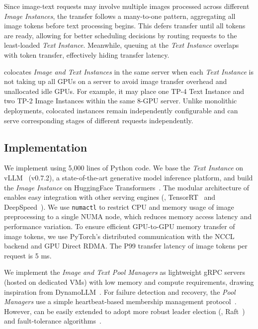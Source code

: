 Since image-text requests may involve multiple images processed across different \emph{Image Instances}, the transfer follows a many-to-one pattern, aggregating all image tokens before text processing begins.
This defers transfer until all tokens are ready, allowing for better scheduling decisions by routing requests to the least-loaded \emph{Text Instance}.
Meanwhile, queuing at the \emph{Text Instance} overlaps with token transfer, effectively hiding transfer latency.

\sysname{} colocates \emph{Image and Text Instances} in the same server when each \emph{Text Instance} is not taking up all GPUs on a server to avoid image transfer overhead and unallocated idle GPUs.
For example, it may place one TP-4 Text Instance and two TP-2 Image Instances within the same 8-GPU server.
Unlike monolithic deployments, colocated instances remain independently configurable and can serve corresponding stages of different requests independently.


\subsection{Implementation}
\label{sec:design:implementation}

We implement \sysname{} using 5,000 lines of Python code.
We base the \emph{Text Instance} on vLLM~\cite{vllm} (v0.7.2), a state-of-the-art generative model inference platform, and build the \emph{Image Instance} on HuggingFace Transformers~\cite{hf-transformers}.
The modular architecture of \sysname{} enables easy integration with other serving engines (\eg{}, TensorRT~\cite{tensor-rt} and DeepSpeed~\cite{deepspeed}).
We use \texttt{numactl} to restrict CPU and memory usage of image preprocessing to a single NUMA node, which reduces memory access latency and performance variation.
To ensure efficient GPU-to-GPU memory transfer of image tokens, we use PyTorch's distributed communication with the NCCL backend and GPU Direct RDMA.
The P99 transfer latency of image tokens per request is 5 ms.

We implement the \emph{Image and Text Pool Managers} as lightweight gRPC servers (hosted on dedicated VMs) with low memory and compute requirements, drawing inspiration from DynamoLLM~\cite{stojkovic2024dynamollm}.
For failure detection and recovery, the \emph{Pool Managers} use a simple heartbeat-based membership management protocol~\cite{gupta2001scalable}.
However, \sysname{} can be easily extended to adopt more robust leader election (\eg{}, Raft~\cite{raft}) and fault-tolerance algorithms~\cite{pb}.